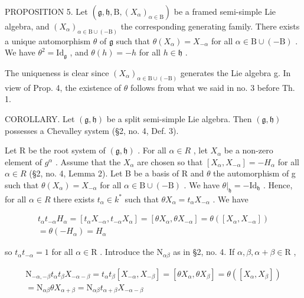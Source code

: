 PROPOSITION 5. Let \((\mathfrak{g},\mathfrak{h},\mathrm{B},(X_{\alpha})_{\alpha \in \mathrm{B}})\) be a framed semi-simple Lie algebra, and \((X_{\alpha})_{\alpha \in \mathrm{B}\cup (-\mathrm{B})}\) the corresponding generating family. There exists a unique automorphism \(\theta\) of \(\mathfrak{g}\) such that \(\theta (X_{\alpha}) = X_{-\alpha}\) for all \(\alpha \in \mathrm{B}\cup (-\mathrm{B})\) . We have \(\theta^2 = \mathrm{Id}_{\mathfrak{g}}\) , and \(\theta (h) = -h\) for all \(h\in \mathfrak{h}\) .

The uniqueness is clear since \((X_{\alpha})_{\alpha\in\mathrm{B}\cup(-\mathrm{B})}\) generates the Lie algebra g. In view of Prop. 4, the existence of \(\theta\) follows from what we said in no. 3 before Th. 1.

COROLLARY. Let \((\mathfrak{g},\mathfrak{h})\) be a split semi-simple Lie algebra. Then \((\mathfrak{g},\mathfrak{h})\) possesses a Chevalley system (§2, no. 4, Def. 3).

Let R be the root system of \((\mathfrak{g},\mathfrak{h})\) . For all \(\alpha\in R\) , let \(X_{\alpha}\) be a non-zero element of \(g^{\alpha}\) . Assume that the \(X_{\alpha}\) are chosen so that \([X_{\alpha},X_{-\alpha}]=-H_{\alpha}\) for all \(\alpha\in R\) (§2, no. 4, Lemma 2). Let B be a basis of R and \(\theta\) the automorphism of g such that \(\theta(X_{\alpha})=X_{-\alpha}\) for all \(\alpha\in\mathrm{B}\cup(-\mathrm{B})\) . We have \(\theta|_{\mathfrak{h}}=-\mathrm{Id}_{\mathfrak{h}}\) . Hence, for all \(\alpha\in R\) there exists \(t_{\alpha}\in k^{*}\) such that \(\theta X_{\alpha}=t_{\alpha}X_{-\alpha}\) . We have

\[
\begin{array}{c} t _ {\alpha} t _ {- \alpha} H _ {\alpha} = [ t _ {\alpha} X _ {- \alpha}, t _ {- \alpha} X _ {\alpha} ] = [ \theta X _ {\alpha}, \theta X _ {- \alpha} ] = \theta ([ X _ {\alpha}, X _ {- \alpha} ]) \\ = \theta (- H _ {\alpha}) = H _ {\alpha} \end{array}
\]

so \(t_{\alpha}t_{-\alpha} = 1\) for all \(\alpha \in \mathrm{R}\) . Introduce the \(\mathrm{N}_{\alpha \beta}\) as in §2, no. 4. If \(\alpha, \beta, \alpha + \beta \in \mathrm{R}\) ,

\[
\begin{array}{r} \mathrm{N} _ {- \alpha , - \beta} t _ {\alpha} t _ {\beta} X _ {- \alpha - \beta} = t _ {\alpha} t _ {\beta} [ X _ {- \alpha}, X _ {- \beta} ] = [ \theta X _ {\alpha}, \theta X _ {\beta} ] = \theta ([ X _ {\alpha}, X _ {\beta} ]) \\ = \mathrm{N} _ {\alpha \beta} \theta X _ {\alpha + \beta} = \mathrm{N} _ {\alpha \beta} t _ {\alpha + \beta} X _ {- \alpha - \beta} \end{array}
\]

